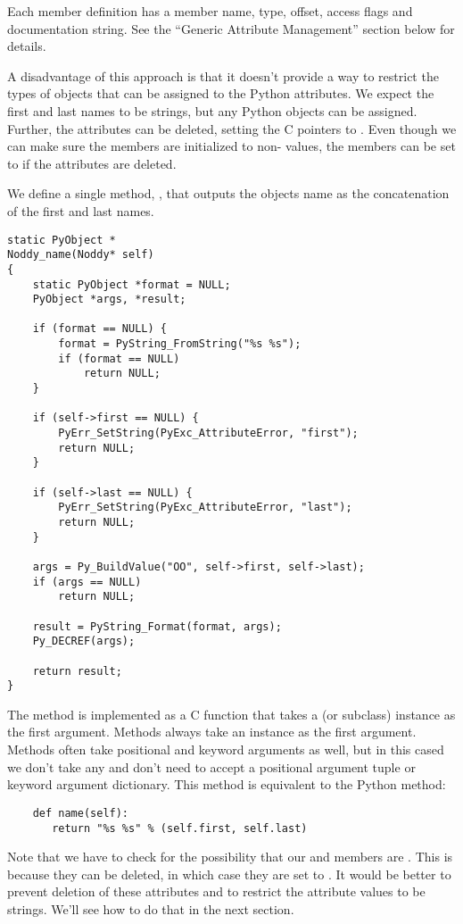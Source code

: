 Each member definition has a member name, type, offset, access flags
and documentation string. See the ``Generic Attribute Management''
section below for details.

A disadvantage of this approach is that it doesn't provide a way to
restrict the types of objects that can be assigned to the Python
attributes.  We expect the first and last names to be strings, but any
Python objects can be assigned.  Further, the attributes can be
deleted, setting the C pointers to \NULL.  Even though we can make
sure the members are initialized to non-\NULL{} values, the members can
be set to \NULL{} if the attributes are deleted.

We define a single method, , that outputs the objects
name as the concatenation of the first and last names.  

\begin{verbatim}
static PyObject *
Noddy_name(Noddy* self)
{
    static PyObject *format = NULL;
    PyObject *args, *result;

    if (format == NULL) {
        format = PyString_FromString("%s %s");
        if (format == NULL)
            return NULL;
    }

    if (self->first == NULL) {
        PyErr_SetString(PyExc_AttributeError, "first");
        return NULL;
    }

    if (self->last == NULL) {
        PyErr_SetString(PyExc_AttributeError, "last");
        return NULL;
    }

    args = Py_BuildValue("OO", self->first, self->last);
    if (args == NULL)
        return NULL;

    result = PyString_Format(format, args);
    Py_DECREF(args);
    
    return result;
}
\end{verbatim}

The method is implemented as a C function that takes a  (or
 subclass) instance as the first argument.  Methods
always take an instance as the first argument. Methods often take
positional and keyword arguments as well, but in this cased we don't
take any and don't need to accept a positional argument tuple or
keyword argument dictionary. This method is equivalent to the Python
method:

\begin{verbatim}
    def name(self):
       return "%s %s" % (self.first, self.last)
\end{verbatim}

Note that we have to check for the possibility that our 
and  members are \NULL.  This is because they can be
deleted, in which case they are set to \NULL.  It would be better to
prevent deletion of these attributes and to restrict the attribute
values to be strings.  We'll see how to do that in the next section.

